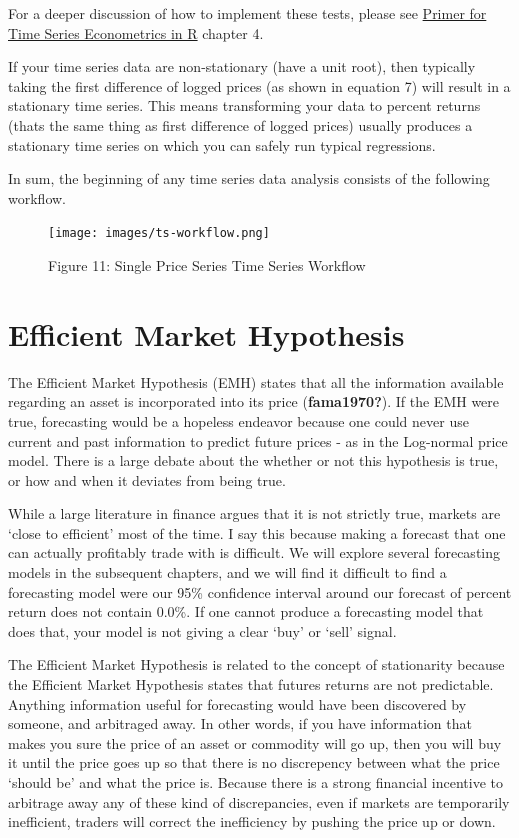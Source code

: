 \documentclass[
  letterpaper,
  DIV=11,
  numbers=noendperiod]{scrreprt}
\begin{document}
For a deeper discussion of how to implement these tests, please see
\href{http://mindymallory.com/R-Companion-Price-Analysis/}{Primer for
Time Series Econometrics in R} chapter 4.

If your time series data are non-stationary (have a unit root), then
typically taking the first difference of logged prices (as shown in
equation 7) will result in a stationary time series. This means
transforming your data to percent returns (thats the same thing as first
difference of logged prices) usually produces a stationary time series
on which you can safely run typical regressions.

In sum, the beginning of any time series data analysis consists of the
following workflow.

\begin{figure}[H]

{\centering \texttt{[image: images/ts-workflow.png]}

}

\caption{Figure 11: Single Price Series Time Series Workflow}

\end{figure}%

\section{Efficient Market Hypothesis}\label{efficient-market-hypothesis}

The Efficient Market Hypothesis (EMH) states that all the information
available regarding an asset is incorporated into its price
(\textbf{fama1970?}). If the EMH were true, forecasting would be a
hopeless endeavor because one could never use current and past
information to predict future prices - as in the Log-normal price model.
There is a large debate about the whether or not this hypothesis is
true, or how and when it deviates from being true.

While a large literature in finance argues that it is not strictly true,
markets are `close to efficient' most of the time. I say this because
making a forecast that one can actually profitably trade with is
difficult. We will explore several forecasting models in the subsequent
chapters, and we will find it difficult to find a forecasting model were
our 95\% confidence interval around our forecast of percent return does
not contain 0.0\%. If one cannot produce a forecasting model that does
that, your model is not giving a clear `buy' or `sell' signal.

The Efficient Market Hypothesis is related to the concept of
stationarity because the Efficient Market Hypothesis states that futures
returns are not predictable. Anything information useful for forecasting
would have been discovered by someone, and arbitraged away. In other
words, if you have information that makes you sure the price of an asset
or commodity will go up, then you will buy it until the price goes up so
that there is no discrepency between what the price `should be' and what
the price is. Because there is a strong financial incentive to arbitrage
away any of these kind of discrepancies, even if markets are temporarily
inefficient, traders will correct the inefficiency by pushing the price
up or down.
\end{document}
